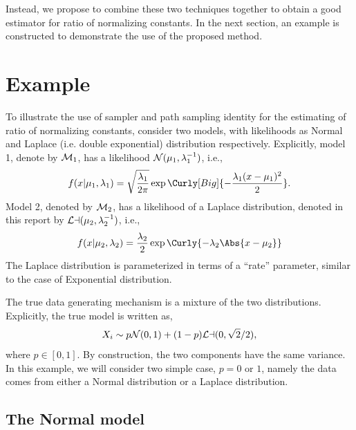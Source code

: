 Instead, we propose to combine these two techniques together to obtain a good
estimator for ratio of normalizing constants. In the next section, an example
is constructed to demonstrate the use of the proposed method.

\section{Example}
\label{sec:Example}

To illustrate the use of \smc sampler and path sampling identity for the
estimating of ratio of normalizing constants, consider two models, with
likelihoods as Normal and Laplace (i.e. double exponential) distribution
respectively. Explicitly, model 1, denote by $\mathcal{M}_1$, has a likelihood
$\mathcal{N}(\mu_1,\lambda_1^{-1})$, i.e.,
\begin{equation}
  f(x|\mu_1,\lambda_1) = \sqrt{\frac{\lambda_1}{2\pi}}
  \exp\Curly[Big]{-\frac{\lambda_1(x-\mu_1)^2}{2}}.
\end{equation}
Model 2, denoted by $\mathcal{M}_2$, has a likelihood of a Laplace distribution,
denoted in this report by $\mathcal{La}(\mu_2,\lambda_2^{-1})$, i.e.,
\begin{equation}
  f(x|\mu_2,\lambda_2) = \frac{\lambda_2}{2}
  \exp\Curly{-\lambda_2\Abs{x - \mu_2}}
\end{equation}
The Laplace distribution is parameterized in terms of a ``rate'' parameter,
similar to the case of Exponential distribution.

The true data generating mechanism is a mixture of the two distributions.
Explicitly, the true model is written as,
\begin{equation}
  X_i \sim p\mathcal{N}(0,1) + (1-p)\mathcal{La}(0, \sqrt{2}/2),
  \label{eq:data_density}
\end{equation}
where $p\in[0,1]$. By construction, the two components have the same variance.
In this example, we will consider two simple case, $p = 0$ or $1$, namely the
data comes from either a Normal distribution or a Laplace distribution.

\subsection{The Normal model}

